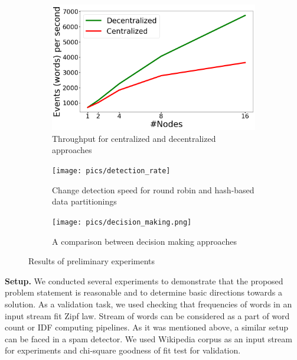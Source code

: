 \label {fs-short-experiments}

\begin{figure}[t!]
    \begin{subfigure}[b]{0.31\textwidth}
            \includegraphics[width=\linewidth]{pics/throughput}
            \caption{Throughput for centralized and decentralized approaches}
            \label{throughput}
    \end{subfigure}%
    \hspace{5mm}
    \begin{subfigure}[b]{0.31\textwidth}
            \texttt{[image: pics/detection\_rate]}
            \caption{Change detection speed for round robin and hash-based data partitionings}
            \label{detection_rate}
    \end{subfigure}%
    \hspace{5mm}
    \begin{subfigure}[b]{0.31\textwidth}
            \texttt{[image: pics/decision\_making.png]}
            \caption{A comparison between decision making approaches}
            \label{decision_making}
    \end{subfigure}%
    \caption{Results of preliminary experiments}
\end{figure}


\indent

{\bf Setup.} We conducted several experiments to demonstrate that the proposed problem statement is reasonable and to determine basic directions towards a solution. As a validation task, we used checking that frequencies of words in an input stream fit Zipf law. Stream of words can be considered as a part of word count or IDF computing pipelines. As it was mentioned above, a similar setup can be faced in a spam detector. We used Wikipedia corpus as an input stream for experiments and chi-square goodness of fit test for validation.

